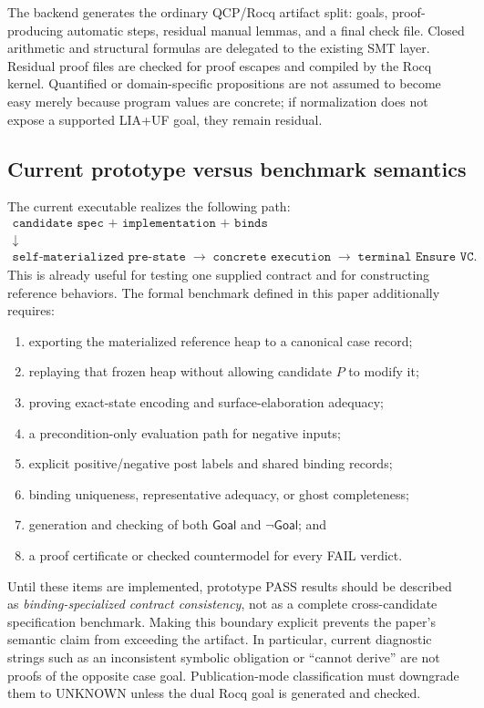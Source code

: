 \documentclass[10pt]{article}
\newcommand{\rocq}{Rocq}
\newcommand{\pass}{\textsf{PASS}}
\newcommand{\fail}{\textsf{FAIL}}
\newcommand{\unknown}{\textsf{UNKNOWN}}
\newcommand{\goal}{\mathsf{Goal}}
\begin{document}
The backend generates the ordinary QCP/\rocq{} artifact split: goals,
proof-producing automatic steps, residual manual lemmas, and a final check
file.  Closed arithmetic and structural formulas are delegated to the existing
SMT layer.  Residual proof files are checked for proof escapes and compiled by
the \rocq{} kernel.  Quantified or domain-specific propositions are not assumed
to become easy merely because program values are concrete; if normalization
does not expose a supported LIA+UF goal, they remain residual.

\subsection{Current prototype versus benchmark semantics}

The current executable realizes the following path:
\[
\begin{gathered}
\texttt{candidate spec + implementation + binds}\\[-1mm]
\downarrow\\[-1mm]
\texttt{self-materialized pre-state}
\;\longrightarrow\;
\texttt{concrete execution}
\;\longrightarrow\;
\texttt{terminal Ensure VC}.
\end{gathered}
\]
This is already useful for testing one supplied contract and for constructing
reference behaviors.  The formal benchmark defined in this paper additionally
requires:

\begin{enumerate}[leftmargin=1.4em]
  \item exporting the materialized reference heap to a canonical case record;
  \item replaying that frozen heap without allowing candidate $P$ to modify it;
  \item proving exact-state encoding and surface-elaboration adequacy;
  \item a precondition-only evaluation path for negative inputs;
  \item explicit positive/negative post labels and shared binding records;
  \item binding uniqueness, representative adequacy, or ghost completeness;
  \item generation and checking of both $\goal$ and $\neg\goal$; and
  \item a proof certificate or checked countermodel for every \fail{} verdict.
\end{enumerate}

Until these items are implemented, prototype \pass{} results should be
described as \emph{binding-specialized contract consistency}, not as a complete
cross-candidate specification benchmark.  Making this boundary explicit
prevents the paper's semantic claim from exceeding the artifact.
In particular, current diagnostic strings such as an inconsistent symbolic
obligation or ``cannot derive'' are not proofs of the opposite case goal.
Publication-mode classification must downgrade them to \unknown{} unless the
dual \rocq{} goal is generated and checked.
\end{document}
